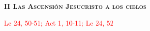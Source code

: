 \begin{center}
    \textbf{\textsc{II Las Ascensión Jesucristo a los cielos}}
    
    \textcolor{red}{Lc 24, 50-51; Act 1, 10-11; Lc 24, 52}
\end{center}

